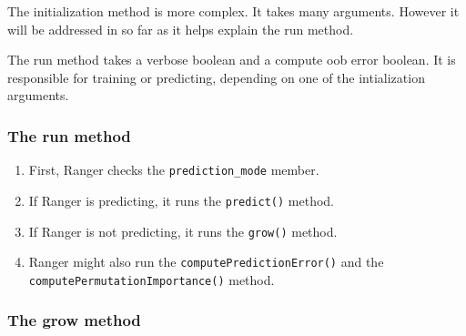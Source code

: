 \documentclass[12pt,oneside]{book}
\begin{document}
The initialization method is more complex. It takes many arguments. However it will be addressed in so far as it helps explain the run method.

The run method takes a verbose boolean and a compute oob error boolean. It is responsible for training or predicting, depending on one of the intialization arguments.

\subsubsection{The run method}

\begin{enumerate}
  \item First, Ranger checks the \lstinline|prediction_mode| member.
  \item If Ranger is predicting, it runs the \lstinline|predict()| method.
  \item If Ranger is not predicting, it runs the \lstinline|grow()| method.
  \item Ranger might also run the \lstinline|computePredictionError()| and the \lstinline|computePermutationImportance()| method.
\end{enumerate}

\subsubsection{The grow method}
\end{document}
